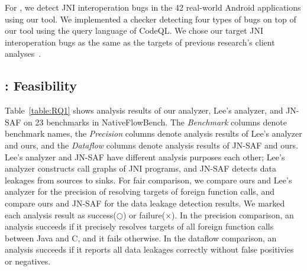 
For , we detect JNI interoperation bugs in the 42 real-world Android
applications using our tool. We implemented a checker detecting four types of
bugs on top of our tool using the query language of CodeQL. We chose our target
JNI interoperation bugs as the same as the targets of previous research's
client analyses~\cite{LeeASE20, ILEA}.


\subsection{: Feasibility}

Table~\ref{table:RQ1} shows analysis results of our analyzer, Lee's analyzer,
and JN-SAF on 23 benchmarks in NativeFlowBench.  The {\it Benchmark} columns
denote benchmark names, the {\it Precision} columns denote analysis results of
Lee's analyzer and ours, and the {\it Dataflow} columns denote analysis results
of JN-SAF and ours.  Lee's analyzer and JN-SAF have different analysis purposes
each other; Lee's analyzer constructs call graphs of JNI programs, and JN-SAF
detects data leakages from sources to sinks. For fair comparison, we compare
ours and Lee's analyzer for the precision of resolving targets of foreign
function calls, and compare ours and JN-SAF for the data leakage detection
results. We marked each analysis result as success($\bigcirc$) or
failure($\times$). In the precision comparison, an analysis succeeds if
it precisely resolves targets of all foreign function calls between Java and C,
and it fails otherwise. In the dataflow comparison, an analysis succeeds
if it reports all data leakages correctly without false positivies or
negatives.



